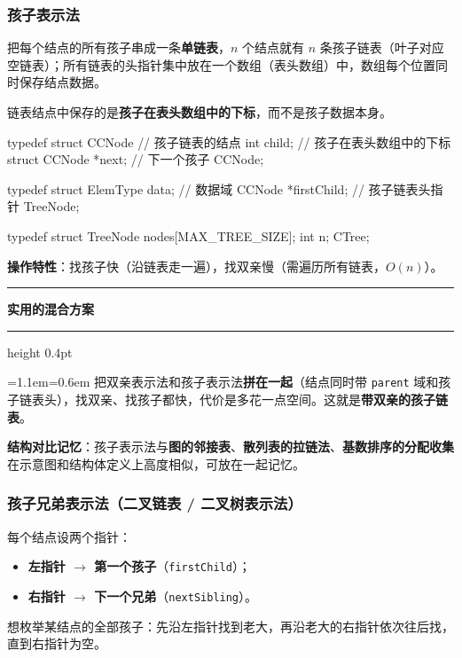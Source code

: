 \documentclass[11pt,openany,UTF8]{ctexbook}
\newcommand{\callouthead}[2]{%
  \par\addvspace{7pt}\noindent
  {\color{#1}\rule[-0.15em]{3pt}{1.05em}}\hspace{0.5em}%
  {\bfseries\color{#1}#2}\par\nobreak\vspace{-0.35em}%
  {\color{rulesep}\hrule height 0.4pt}\nobreak\vspace{0.45em}%
  \begingroup\small\setlength{\parindent}{0pt}%
  \leftskip=1.1em\rightskip=0.6em\noindent\ignorespaces}
\newcommand{\calloutend}{\par\endgroup\addvspace{7pt}}
\newenvironment{callkey}[1]{\callouthead{keybar}{#1}}{\calloutend}
\begin{document}
\subsubsection{孩子表示法}

把每个结点的所有孩子串成一条\textbf{单链表}，$n$ 个结点就有 $n$ 条孩子链表（叶子对应空链表）；所有链表的头指针集中放在一个数组（表头数组）中，数组每个位置同时保存结点数据。

链表结点中保存的是\textbf{孩子在表头数组中的下标}，而不是孩子数据本身。

\begin{codebox}
typedef struct CCNode {          // 孩子链表的结点
    int child;                   // 孩子在表头数组中的下标
    struct CCNode *next;         // 下一个孩子
} CCNode;

typedef struct {
    ElemType data;               // 数据域
    CCNode *firstChild;          // 孩子链表头指针
} TreeNode;

typedef struct {
    TreeNode nodes[MAX_TREE_SIZE];
    int n;
} CTree;
\end{codebox}

\textbf{操作特性}：找孩子快（沿链表走一遍），找双亲慢（需遍历所有链表，$O(n)$）。

\begin{callkey}{实用的混合方案}
把双亲表示法和孩子表示法\textbf{拼在一起}（结点同时带 \texttt{parent} 域和孩子链表头），找双亲、找孩子都快，代价是多花一点空间。这就是\textbf{带双亲的孩子链表}。

\end{callkey}

\textbf{结构对比记忆}：孩子表示法与\textbf{图的邻接表}、\textbf{散列表的拉链法}、\textbf{基数排序的分配收集}在示意图和结构体定义上高度相似，可放在一起记忆。

\subsubsection{孩子兄弟表示法（二叉链表 / 二叉树表示法）}

每个结点设两个指针：

\begin{itemize}
\item \textbf{左指针 $\to$ 第一个孩子}（\texttt{firstChild}）；
\item \textbf{右指针 $\to$ 下一个兄弟}（\texttt{nextSibling}）。
\end{itemize}
想枚举某结点的全部孩子：先沿左指针找到老大，再沿老大的右指针依次往后找，直到右指针为空。
\end{document}
